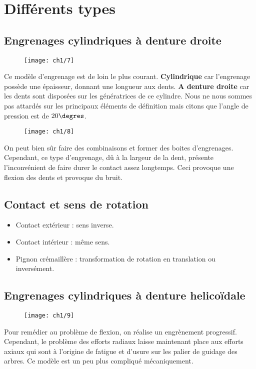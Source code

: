 \section{Différents types}
\subsection{Engrenages cylindriques à denture droite}
	\begin{wrapfigure}[5]{l}{2.5cm}
	\vspace{-5mm}
	\texttt{[image: ch1/7]}
	\end{wrapfigure}	
	\noindent Ce modèle d'engrenage est de loin le plus courant. \textbf{Cylindrique} car l'engrenage possède une épaisseur, donnant une longueur aux dents. \textbf{A denture droite} car les dents sont disposées sur les génératrices de ce cylindre. Nous ne nous sommes pas attardés sur les principaux éléments de définition mais citons que l'angle de pression est de $20\degres$. \\
	
	\begin{wrapfigure}[5]{r}{2.5cm}
	\vspace{-5mm}
	\texttt{[image: ch1/8]}
	\end{wrapfigure}	
	\noindent On peut bien sûr faire des combinaisons et former des boites d'engrenages. Cependant, ce type d'engrenage, dû à la largeur de la dent, présente l'inconvénient de faire durer le contact assez longtemps. Ceci provoque une flexion des dents et provoque du bruit.
	
\subsection{Contact et sens de rotation}
	\begin{itemize}
	\item Contact extérieur : sens inverse.
	\item Contact intérieur : même sens.
	\item Pignon crémaillère : transformation de rotation en translation ou inversément. 
	\end{itemize}
	
\subsection{Engrenages cylindriques à denture helicoïdale}
	\begin{wrapfigure}[5]{l}{2cm}
	\vspace{-5mm}
	\texttt{[image: ch1/9]}
	\end{wrapfigure}	
	\noindent Pour remédier au problème de flexion, on réalise un engrènement progressif. Cependant, le problème des efforts radiaux laisse maintenant place aux efforts axiaux qui sont à l'origine de fatigue et d'usure sur les palier de guidage des arbres. Ce modèle est un peu plus compliqué mécaniquement. \\
	

